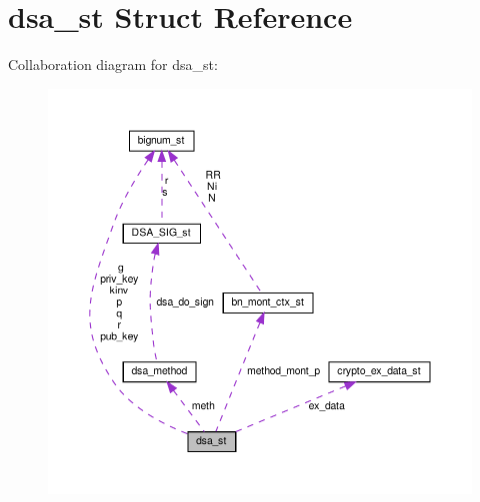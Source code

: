 \hypertarget{structdsa__st}{}\section{dsa\+\_\+st Struct Reference}
\label{structdsa__st}


Collaboration diagram for dsa\+\_\+st\+:
\nopagebreak
\begin{figure}[H]
\begin{center}
\leavevmode
\includegraphics[width=350pt]{structdsa__st__coll__graph}
\end{center}
\end{figure}
